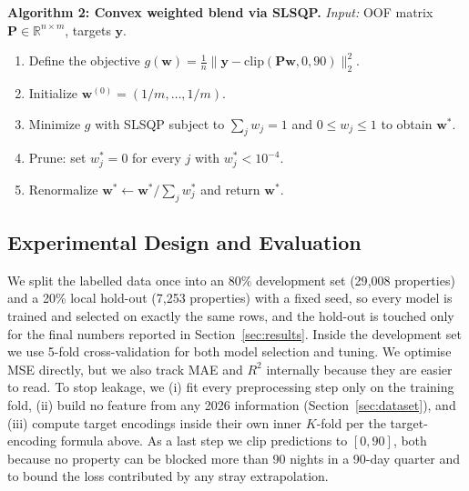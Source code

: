 \documentclass[journal]{IEEEtran}
\begin{document}
\vspace{2pt}
\noindent\textbf{Algorithm 2: Convex weighted blend via SLSQP.}
\emph{Input:} OOF matrix $\mathbf{P}\in\mathbb{R}^{n\times m}$, targets
$\mathbf{y}$.
\begin{enumerate}
\item Define the objective
$g(\mathbf{w})=\frac{1}{n}\lVert\mathbf{y}-\mathrm{clip}(\mathbf{P}\mathbf{w},0,90)\rVert_2^2$.
\item Initialize $\mathbf{w}^{(0)}=(1/m,\dots,1/m)$.
\item Minimize $g$ with SLSQP subject to $\sum_j w_j=1$ and $0\le w_j\le1$ to
obtain $\mathbf{w}^{*}$.
\item Prune: set $w_j^{*}=0$ for every $j$ with $w_j^{*}<10^{-4}$.
\item Renormalize $\mathbf{w}^{*}\leftarrow\mathbf{w}^{*}/\sum_j w_j^{*}$ and
return $\mathbf{w}^{*}$.
\end{enumerate}
\vspace{2pt}

\subsection{Experimental Design and Evaluation}
We split the labelled data once into an 80\% development set (29{,}008
properties) and a 20\% local hold-out (7{,}253 properties) with a fixed seed, so
every model is trained and selected on exactly the same rows, and the hold-out
is touched only for the final numbers reported in
Section~\ref{sec:results}. Inside the development set we use 5-fold
cross-validation for both model selection and tuning. We optimise MSE directly,
but we also track MAE and $R^2$ internally because they are easier to read. To
stop leakage, we (i) fit every preprocessing step only on the training fold,
(ii) build no feature from any 2026 information (Section~\ref{sec:dataset}),
and (iii) compute target encodings inside their own inner $K$-fold per
the target-encoding formula above. As a last step we clip predictions to $[0,90]$, both
because no property can be blocked more than 90 nights in a 90-day quarter and
to bound the loss contributed by any stray extrapolation.
\end{document}
